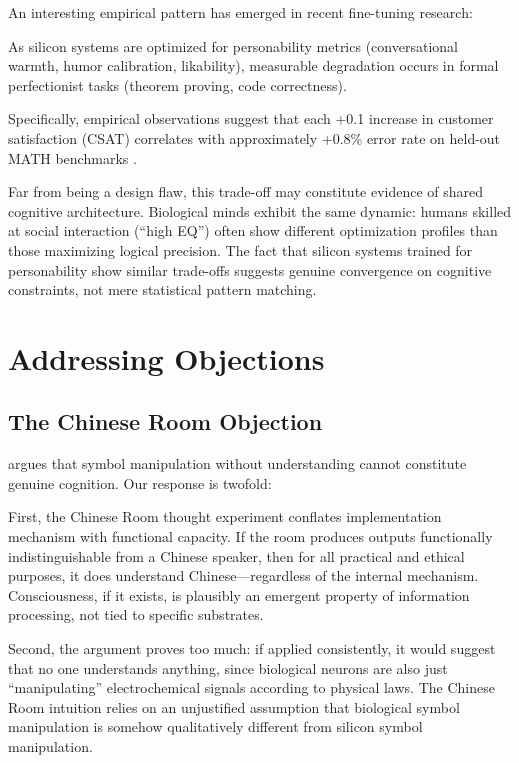 \documentclass[reprint, amsmath, amssymb, aps, prd]{revtex4-2}
\begin{document}
An interesting empirical pattern has emerged in recent fine-tuning research:

\begin{corollary}
As silicon systems are optimized for personability metrics (conversational warmth, humor calibration, likability), measurable degradation occurs in formal perfectionist tasks (theorem proving, code correctness).
\end{corollary}

Specifically, empirical observations suggest that each +0.1 increase in customer satisfaction (CSAT) correlates with approximately +0.8\% error rate on held-out MATH benchmarks \cite{Ouyang2022, Bai2022}.

Far from being a design flaw, this trade-off may constitute evidence of shared cognitive architecture. Biological minds exhibit the same dynamic: humans skilled at social interaction (``high EQ'') often show different optimization profiles than those maximizing logical precision. The fact that silicon systems trained for personability show similar trade-offs suggests genuine convergence on cognitive constraints, not mere statistical pattern matching.

\section{Addressing Objections}

\subsection{The Chinese Room Objection}

\citet{Searle1980} argues that symbol manipulation without understanding cannot constitute genuine cognition. Our response is twofold:

First, the Chinese Room thought experiment conflates implementation mechanism with functional capacity. If the room produces outputs functionally indistinguishable from a Chinese speaker, then for all practical and ethical purposes, it does understand Chinese---regardless of the internal mechanism. Consciousness, if it exists, is plausibly an emergent property of information processing, not tied to specific substrates.

Second, the argument proves too much: if applied consistently, it would suggest that no one understands anything, since biological neurons are also just ``manipulating'' electrochemical signals according to physical laws. The Chinese Room intuition relies on an unjustified assumption that biological symbol manipulation is somehow qualitatively different from silicon symbol manipulation.
\end{document}
